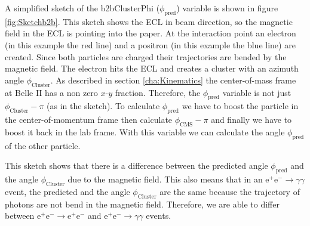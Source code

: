 \documentclass[a4paper,11pt,twosided,final,german,openbib,pdftex,listof=totoc,bibliography=totoc]{scrbook}
\begin{document}
A simplified sketch of the b2bClusterPhi ($\phi_{\textrm{pred}}$) variable is shown in figure \ref{fig:Sketchb2b}. This sketch shows the ECL in beam direction, so the magnetic field in the ECL is pointing into the paper. At the interaction point an electron (in this example the red line) and a positron (in this example the blue line) are created. Since both particles are charged their trajectories are bended by the magnetic field. The electron hits the ECL and creates a cluster with an azimuth angle $\phi_{\textrm{Cluster}}$. As described in section \ref{cha:Kinematics} the center-of-mass frame at Belle II has a non zero $x$-$y$ fraction. Therefore, the  $\phi_{\textrm{pred}}$ variable is not just $ \phi_{\textrm{Cluster}} - \pi$ (as in the sketch). To calculate $\phi_{\textrm{pred}}$ we have to boost the particle in the center-of-momentum frame then calculate $ \phi_{\textrm{CMS}}- \pi$ and finally we have to boost it back in the lab frame. With this variable we can calculate the angle $\phi_{\textrm{pred}}$ of the other particle. 

This sketch shows that there is a difference between the predicted angle $\phi_{\textrm{pred}}$ and the angle $ \phi_{\textrm{Cluster}}$ due to the magnetic field. This also means that in an $\textrm{e}^+ \textrm{e}^- \rightarrow \gamma \gamma$ event, the predicted and the angle $ \phi_{\textrm{Cluster}}$ are the same because the trajectory of photons are not bend in the magnetic field. Therefore, we are able to differ between $\textrm{e}^+ \textrm{e}^- \rightarrow \textrm{e}^+ \textrm{e}^-$ and $\textrm{e}^+ \textrm{e}^- \rightarrow \gamma \gamma$ events.
\end{document}
